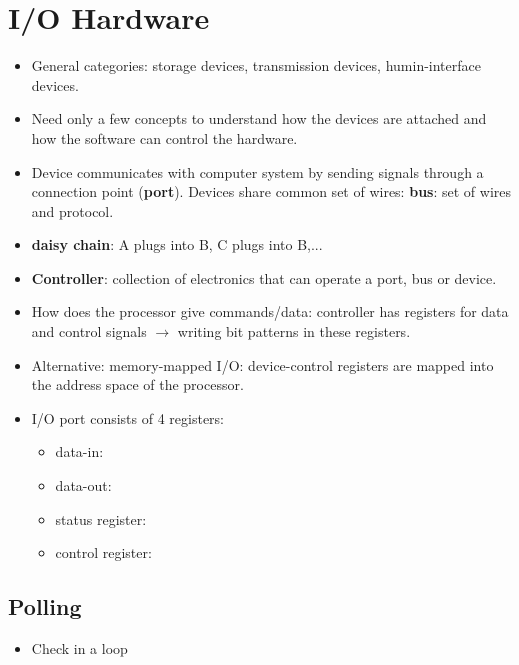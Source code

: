 \documentclass[10pt]{report}
\begin{document}
	\section{I/O Hardware}
		\begin{itemize}
			\item General categories: storage devices, transmission devices, humin-interface devices.
			\item Need only a few concepts to understand how the devices are attached and how the software can control the hardware.
			\item Device communicates with computer system by sending signals through a connection point (\textbf{port}). Devices share common set of wires: \textbf{bus}: set of wires and protocol.
			\item \textbf{daisy chain}: A plugs into B, C plugs into B,...
			\item \textbf{Controller}: collection of electronics that can operate a port, bus or device.
			\item How does the processor give commands/data: controller has registers for data and control signals $\rightarrow$ writing bit patterns in these registers.
			\item Alternative: memory-mapped I/O: device-control registers are mapped into the address space of the processor.
			\item I/O port consists of 4 registers:
			\begin{itemize}
				\item data-in:
				\item data-out:
				\item status register:
				\item control register:
			\end{itemize}
		\end{itemize}

		\subsection{Polling}
			\begin{itemize}
				\item Check in a loop
			\end{itemize}
\end{document}
